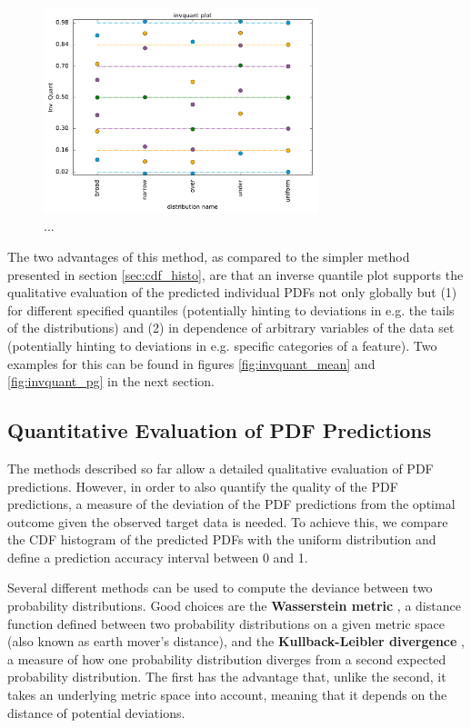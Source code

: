 \documentclass[BCOR=1mm, DIV=calc,10pt,
twoside=true,
twocolumn,
headings=normal]{scrartcl}
\begin{document}
\begin{figure}
\begin{center}
\includegraphics[width=8cm]{../figures/invquant_profiles}
\caption{\label{fig:invquant_profiles} ...}
\end{center}
\end{figure}

The two advantages of this method, as compared to the simpler method presented in section
\ref{sec:cdf_histo}, are that an inverse quantile plot supports the qualitative evaluation
of the predicted individual PDFs not only globally but (1) for different specified
quantiles (potentially hinting to deviations in e.g. the tails of the distributions) and
(2) in dependence of arbitrary variables of the data set (potentially hinting to
deviations in e.g. specific categories of a feature). Two examples for this can be found
in figures \ref{fig:invquant_mean} and \ref{fig:invquant_pg} in the next section.

\subsection{Quantitative Evaluation of PDF Predictions}

The methods described so far allow a detailed qualitative evaluation of PDF predictions.
However, in order to also quantify the quality of the PDF predictions, a measure of the
deviation of the PDF predictions from the optimal outcome given the observed target data
is needed. To achieve this, we compare the CDF histogram of the predicted PDFs with the
uniform distribution and define a prediction accuracy interval between 0 and 1.

Several different methods can be used to compute the deviance between two probability
distributions. Good choices are the \textbf{Wasserstein metric} \cite{olkin1982}, a
distance function defined between two probability distributions on a given metric space
(also known as earth mover’s distance), and the \textbf{Kullback-Leibler divergence}
\cite{kullback1951}, a measure of how one probability distribution diverges from a second
expected probability distribution. The first has the advantage that, unlike the second, it
takes an underlying metric space into account, meaning that it depends on the distance of
potential deviations.
\end{document}
